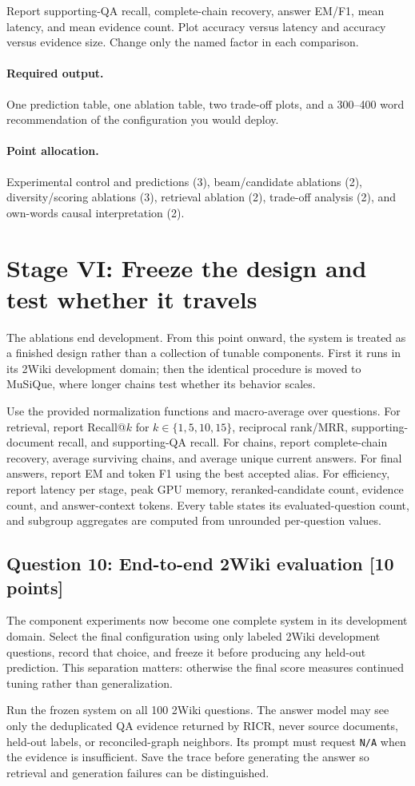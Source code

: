 \documentclass[11pt]{article}
\newcommand{\code}[1]{\texttt{#1}}
\newcommand{\RICR}{{\mdseries\textsc{RICR}}\xspace}
\newcommand{\question}[3]{%
  \subsection[Question #1: #2 (#3 points)]{Question #1: #2 \hfill [#3 points]}%
}
\newcommand{\deliverables}{\paragraph{Required output.}}
\newcommand{\grading}{\paragraph{Point allocation.}}
\begin{document}
Report supporting-QA recall, complete-chain recovery, answer EM/F1, mean
latency, and mean evidence count. Plot accuracy versus latency and accuracy
versus evidence size. Change only the named factor in each comparison.

\deliverables One prediction table, one ablation table, two trade-off plots,
and a 300--400 word recommendation of the configuration you would deploy.

\grading Experimental control and predictions (3), beam/candidate ablations
(2), diversity/scoring ablations (3), retrieval ablation (2), trade-off
analysis (2), and own-words causal interpretation (2).

\section{Stage VI: Freeze the design and test whether it travels}

The ablations end development. From this point onward, the system is treated
as a finished design rather than a collection of tunable components. First it
runs in its 2Wiki development domain; then the identical procedure is moved to
MuSiQue, where longer chains test whether its behavior scales.

Use the provided normalization functions and macro-average over questions.
For retrieval, report Recall@$k$ for $k\in\{1,5,10,15\}$, reciprocal
rank/MRR, supporting-document recall, and supporting-QA recall. For chains,
report complete-chain recovery, average surviving chains, and average unique
current answers. For final answers, report EM and token F1 using the best
accepted alias. For efficiency, report latency per stage, peak GPU memory,
reranked-candidate count, evidence count, and answer-context tokens. Every
table states its evaluated-question count, and subgroup aggregates are
computed from unrounded per-question values.

\question{10}{End-to-end 2Wiki evaluation}{10}

The component experiments now become one complete system in its development
domain. Select the final configuration using only labeled 2Wiki development
questions, record that choice, and freeze it before producing any held-out
prediction. This separation matters: otherwise the final score measures
continued tuning rather than generalization.

Run the frozen system on all 100 2Wiki questions. The answer model may see only
the deduplicated QA evidence returned by \RICR, never source documents,
held-out labels, or reconciled-graph neighbors. Its prompt must request
\code{N/A} when the evidence is insufficient. Save the trace before generating
the answer so retrieval and generation failures can be distinguished.
\end{document}
